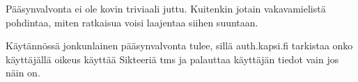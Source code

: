 Pääsynvalvonta ei ole kovin triviaali juttu. Kuitenkin jotain vakavamielistä pohdintaa, miten ratkaisua voisi laajentaa siihen suuntaan.

Käytännössä jonkunlainen pääsynvalvonta tulee, sillä auth.kapsi.fi tarkistaa onko käyttäjällä oikeus käyttää Sikteeriä tms ja palauttaa käyttäjän tiedot vain jos näin on.
